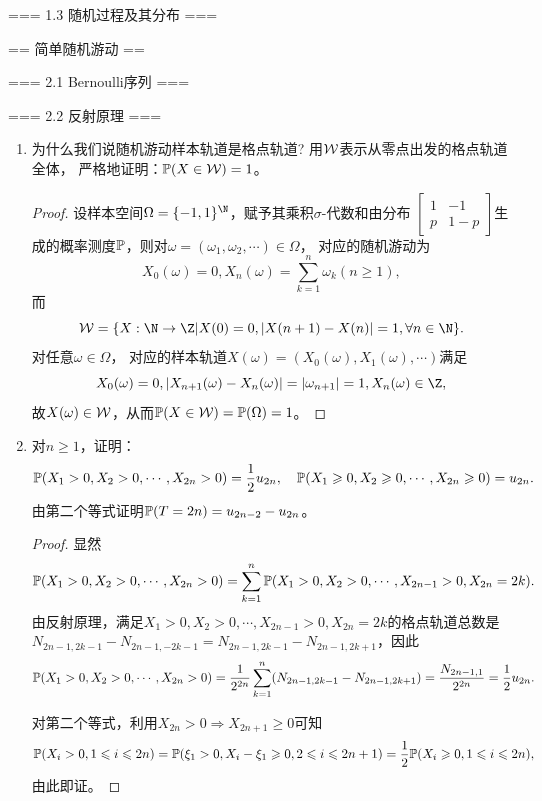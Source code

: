 === 1.3 随机过程及其分布 ===

== 简单随机游动 ==

=== 2.1 Bernoulli序列 ===

=== 2.2 反射原理 ===
\begin{enumerate}
    \item[2.2.1] 为什么我们说随机游动样本轨道是格点轨道? 用$\W$表示从零点出发的格点轨道全体，
    严格地证明：$\P(X\in\W)=1$。
    \begin{proof}
        设样本空间$\Omega=\{-1,1\}^{\N}$，赋予其乘积$\sigma$-代数和由分布
        $\begin{bmatrix}1&-1\\p&1-p\end{bmatrix}$生成的概率测度$\P$，则对$\omega=(\omega_1,\omega_2,\cdots)\in\Omega$，
        对应的随机游动为\[X_0(\omega)=0,X_n(\omega)=\sum_{k=1}^n\omega_k(n\geqslant1),\]
        而\[\W=\{X:\N\to\Z|X(0)=0,|X(n+1)-X(n)|=1,\forall n\in\N\}.\]对任意$\omega\in\Omega$，
        对应的样本轨道$X(\omega)=(X_0(\omega),X_1(\omega),\cdots)$满足
        \[X_0(\omega)=0,|X_{n+1}(\omega)-X_n(\omega)|=|\omega_{n+1}|=1,X_n(\omega)\in\Z,\]
        故$X(\omega)\in\W$，从而$\P(X\in\W)=\P(\Omega)=1$。
    \end{proof}
    \item[2.2.4] 对$n\geqslant1$，证明：\[\P(X_1>0,X_2>0,\cdots,X_{2n}>0)=\frac{1}{2}u_{2n},\quad
    \P(X_1\geqslant0,X_2\geqslant0,\cdots,X_{2n}\geqslant0)=u_{2n}.\]
    由第二个等式证明$\P(T=2n)=u_{2n-2}-u_{2n}$。
    \begin{proof}
        显然\[\P(X_1>0,X_2>0,\cdots,X_{2n}>0)=\sum_{k=1}^n\P(X_1>0,X_2>0,\cdots,X_{2n-1}>0,X_{2n}=2k).\]
        由反射原理，满足$X_1>0,X_2>0,\cdots,X_{2n-1}>0,X_{2n}=2k$的格点轨道总数是
        $N_{2n-1,2k-1}-N_{2n-1,-2k-1}=N_{2n-1,2k-1}-N_{2n-1,2k+1}$，因此
        \[\P(X_1>0,X_2>0,\cdots,X_{2n}>0)=\frac{1}{2^{2n}}\sum_{k=1}^n(N_{2n-1,2k-1}-N_{2n-1,2k+1})=\frac{N_{2n-1,1}}{2^{2n}}=\frac{1}{2}u_{2n}.\]

        对第二个等式，利用$X_{2n}>0\Rightarrow X_{2n+1}\geqslant0$可知
        \[\P(X_i>0,1\leqslant i\leqslant2n)=\P(\xi_1>0,X_i-\xi_1\geqslant0,2\leqslant i\leqslant2n+1)=\frac{1}{2}\P(X_i\geqslant0,1\leqslant i\leqslant2n),\]
        由此即证。


\end{proof}
\end{enumerate}
